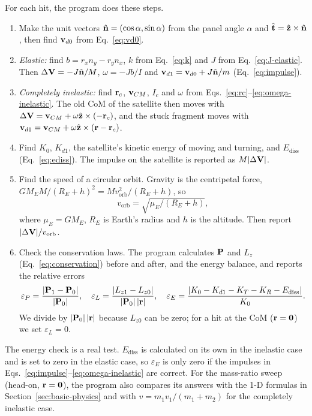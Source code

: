 For each hit, the program does these steps.
\begin{enumerate}
  \item Make the unit vectors $\hat{\mathbf{n}}=(\cos\alpha,\sin\alpha)$ from
    the panel angle $\alpha$ and $\hat{\mathbf{t}}=\hat{\mathbf{z}}\times\hat{\mathbf{n}}$,
    then find $\mathbf{v}_{d0}$ from Eq.~\eqref{eq:vd0}.
  \item \textit{Elastic:} find $b=r_xn_y-r_yn_x$, $k$ from Eq.~\eqref{eq:k}
    and $J$ from Eq.~\eqref{eq:J-elastic}. Then
    $\Delta\mathbf{V}=-J\hat{\mathbf{n}}/M$, $\omega=-Jb/I$ and
    $\mathbf{v}_{d1}=\mathbf{v}_{d0}+J\hat{\mathbf{n}}/m$ (Eq.~\eqref{eq:impulse}).
  \item \textit{Completely inelastic:} find $\mathbf{r}_c$, $\mathbf{v}_{CM}$,
    $I_c$ and $\omega$ from Eqs.~\eqref{eq:rc}--\eqref{eq:omega-inelastic}.
    The old CoM of the satellite then moves with
    $\Delta\mathbf{V}=\mathbf{v}_{CM}+\omega\hat{\mathbf{z}}\times(-\mathbf{r}_c)$, and
    the stuck fragment moves with
    $\mathbf{v}_{d1}=\mathbf{v}_{CM}+\omega\hat{\mathbf{z}}\times(\mathbf{r}-\mathbf{r}_c)$.
  \item Find $K_0$, $K_{d1}$, the satellite's kinetic energy of moving and
    turning, and $E_{\mathrm{diss}}$ (Eq.~\eqref{eq:ediss}). The impulse
    on the satellite is reported as $M|\Delta\mathbf{V}|$.
  \item Find the speed of a circular orbit. Gravity is the centripetal
    force, $GM_EM/(R_E+h)^2=Mv_{\mathrm{orb}}^2/(R_E+h)$, so
    \begin{equation}
      v_{\mathrm{orb}}=\sqrt{\mu_E/(R_E+h)},
      \label{eq:vorb}
    \end{equation}
    where $\mu_E=GM_E$, $R_E$ is Earth's radius and $h$ is the altitude.
    Then report $|\Delta\mathbf{V}|/v_{\mathrm{orb}}$.
  \item Check the conservation laws. The program calculates $\mathbf{P}$ and
    $L_z$ (Eq.~\eqref{eq:conservation}) before and after, and the energy
    balance, and reports the relative errors
    \begin{equation}
      \varepsilon_P=\frac{|\mathbf{P}_1-\mathbf{P}_0|}{|\mathbf{P}_0|},\quad
      \varepsilon_L=\frac{|L_{z1}-L_{z0}|}{|\mathbf{P}_0|\,|\mathbf{r}|},\quad
      \varepsilon_E=\frac{|K_0-K_{d1}-K_T-K_R-E_{\mathrm{diss}}|}{K_0}.
      \label{eq:residuals}
    \end{equation}
    We divide by $|\mathbf{P}_0|\,|\mathbf{r}|$ because $L_{z0}$ can be zero;
    for a hit at the CoM ($\mathbf{r}=\mathbf{0}$) we set $\varepsilon_L=0$.
\end{enumerate}
The energy check is a real test. $E_{\mathrm{diss}}$ is calculated on its
own in the inelastic case and is set to zero in the elastic case, so
$\varepsilon_E$ is only zero if the impulses in
Eqs.~\eqref{eq:impulse}--\eqref{eq:omega-inelastic} are correct. For the
mass-ratio sweep (head-on, $\mathbf{r}=\mathbf{0}$), the program also compares
its answers with the 1-D formulas in Section~\ref{sec:basic-physics} and
with $v=m_1v_1/(m_1+m_2)$ for the completely inelastic case.

